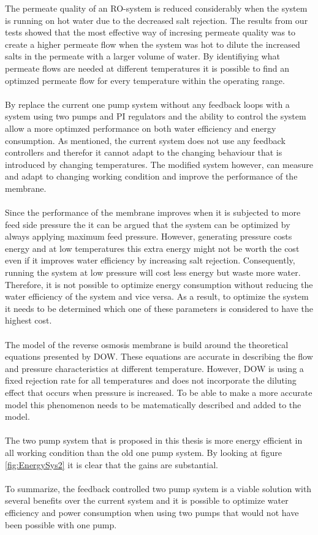 The permeate quality of an RO-system is reduced considerably when the system is running on hot water due to the decreased salt rejection. The results from our tests showed that the most effective way of incresing permeate quality was to create a higher permeate flow when the system was hot to dilute the increased salts in the permeate with a larger volume of water. By identifiying what permeate flows are needed at different temperatures it is possible to find an optimzed permeate flow for every temperature within the operating range.\\
 \\
By replace the current one pump system without any feedback loops with a system using two pumps and PI regulators and the ability to control the system allow a more optimzed performance on both water efficiency and energy consumption. As mentioned, the current system does not use any feedback controllers and therefor it cannot adapt to the changing behaviour that is introduced by changing temperatures. The modified system however, can measure and adapt to changing working condition and improve the performance of the membrane. \\
 \\
Since the performance of the membrane improves when it is subjected to more feed side pressure the it can be argued that the system can be optimized by always applying maximum feed pressure. However, generating pressure costs energy and at low temperatures this extra energy might not be worth the cost even if it improves water efficiency by increasing salt rejection. Consequently, running the system at low pressure will cost less energy but waste more water. Therefore, it is not possible to optimize energy consumption without reducing the water efficiency of the system and vice versa. As a result, to optimize the system it needs to be determined which one of these parameters is considered to have the highest cost. \\
 \\
The model of the reverse osmosis membrane is build around the theoretical equations presented by DOW. These equations are accurate in describing the flow and pressure characteristics at different temperature. However, DOW is using a fixed rejection rate for all temperatures and does not incorporate the diluting effect that occurs when pressure is increased.  To be able to make a more accurate model this phenomenon needs to be matematically described and added to the model. \\
 \\
 The two pump system that is proposed in this thesis is more energy efficient in all working condition than the old one pump system. By looking at figure \ref{fig:EnergySys2} it is clear that the gains are substantial. \\
  \\
To summarize, the feedback controlled two pump system is a viable solution with several benefits over the current system and it is possible to optimize water efficiency and power consumption when using two pumps that would not have been possible with one pump. 
